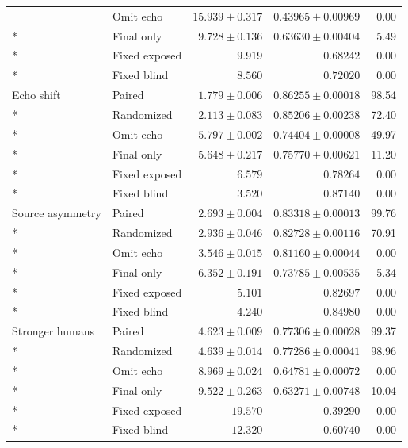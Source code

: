 \begin{longtable}{@{}llrrr@{}}
 & Omit echo & $15.939 \pm 0.317$ & $0.43965 \pm 0.00969$ & 0.00 \\*
 & Final only & $9.728 \pm 0.136$ & $0.63630 \pm 0.00404$ & 5.49 \\*
 & Fixed exposed & $9.919$ & $0.68242$ & 0.00 \\*
 & Fixed blind & $8.560$ & $0.72020$ & 0.00 \\
\addlinespace[3pt]
Echo shift & Paired & $1.779 \pm 0.006$ & $0.86255 \pm 0.00018$ & 98.54 \\*
 & Randomized & $2.113 \pm 0.083$ & $0.85206 \pm 0.00238$ & 72.40 \\*
 & Omit echo & $5.797 \pm 0.002$ & $0.74404 \pm 0.00008$ & 49.97 \\*
 & Final only & $5.648 \pm 0.217$ & $0.75770 \pm 0.00621$ & 11.20 \\*
 & Fixed exposed & $6.579$ & $0.78264$ & 0.00 \\*
 & Fixed blind & $3.520$ & $0.87140$ & 0.00 \\
\addlinespace[3pt]
Source asymmetry & Paired & $2.693 \pm 0.004$ & $0.83318 \pm 0.00013$ & 99.76 \\*
 & Randomized & $2.936 \pm 0.046$ & $0.82728 \pm 0.00116$ & 70.91 \\*
 & Omit echo & $3.546 \pm 0.015$ & $0.81160 \pm 0.00044$ & 0.00 \\*
 & Final only & $6.352 \pm 0.191$ & $0.73785 \pm 0.00535$ & 5.34 \\*
 & Fixed exposed & $5.101$ & $0.82697$ & 0.00 \\*
 & Fixed blind & $4.240$ & $0.84980$ & 0.00 \\
\addlinespace[3pt]
Stronger humans & Paired & $4.623 \pm 0.009$ & $0.77306 \pm 0.00028$ & 99.37 \\*
 & Randomized & $4.639 \pm 0.014$ & $0.77286 \pm 0.00041$ & 98.96 \\*
 & Omit echo & $8.969 \pm 0.024$ & $0.64781 \pm 0.00072$ & 0.00 \\*
 & Final only & $9.522 \pm 0.263$ & $0.63271 \pm 0.00748$ & 10.04 \\*
 & Fixed exposed & $19.570$ & $0.39290$ & 0.00 \\*
 & Fixed blind & $12.320$ & $0.60740$ & 0.00 \\
\end{longtable}
\endgroup
